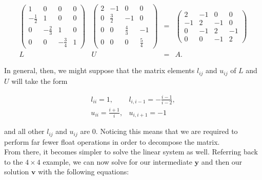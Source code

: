 \documentclass[12pt]{article}
\numberwithin{equation}{section}
\begin{document}
\begin{equation}
\begin{array}{cccc}
\left(\begin{array}{cccc}
1 & 0 & 0 & 0 \\
-\frac{1}{2} & 1 & 0 & 0 \\
0 & -\frac{2}{3} & 1 & 0 \\
0 & 0 & -\frac{3}{4} & 1 
\end{array}\right) &
\left(\begin{array}{cccc}
2 & -1 & 0 & 0 \\
0 & \frac{3}{2} & -1 & 0 \\
0 & 0 & \frac{4}{3} & -1 \\
0 & 0 & 0 & \frac{5}{4} 
\end{array}\right) &=&
\left(\begin{array}{cccc}
2 & -1 & 0 & 0 \\
-1 & 2 & -1 & 0 \\
0 & -1 & 2 & -1 \\
0 & 0 & -1 & 2
\end{array}\right) \\
L & U & = & A.
\end{array}
\end{equation}

\noindent In general, then, we might suppose that the matrix elements $l_{ij}$ and $u_{ij}$ of $L$ and $U$ will take the form

\begin{equation}
\label{eq:luspecalg}
\begin{array}{cc}
l_{ii} = 1, & l_{i,i-1} = -\frac{i-1}{i-2}, \\
u_{ii} = \frac{i+1}{i}, & u_{i,i+1}=-1
\end{array}
\end{equation}
\vspace{.2cm}

\noindent and all other $l_{ij}$ and $u_{ij}$ are 0.  Noticing this means that we are required to perform far fewer float operations in order to decompose the matrix.  
\\\indent From there, it becomes simpler to solve the linear system as well.  Referring back to the $4\times4$ example, we can now solve for our intermediate $\textbf{y}$ and then our solution $\textbf{v}$ with the following equations:
\end{document}
